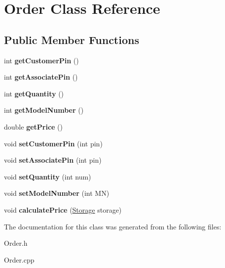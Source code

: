 \hypertarget{classOrder}{}\section{Order Class Reference}
\label{classOrder}
\subsection*{Public Member Functions}
\begin{DoxyCompactItemize}
\item 
int {\bfseries get\+Customer\+Pin} ()\hypertarget{classOrder_a580409072a98cb93cb79962d8b97ebdd}{}\label{classOrder_a580409072a98cb93cb79962d8b97ebdd}

\item 
int {\bfseries get\+Associate\+Pin} ()\hypertarget{classOrder_ab59d867a7364b9c282d8db09d2abe03e}{}\label{classOrder_ab59d867a7364b9c282d8db09d2abe03e}

\item 
int {\bfseries get\+Quantity} ()\hypertarget{classOrder_a458491516d3ef8338525f9be5f5f7dc8}{}\label{classOrder_a458491516d3ef8338525f9be5f5f7dc8}

\item 
int {\bfseries get\+Model\+Number} ()\hypertarget{classOrder_a8379026e646f8e9dc8efe19325bb3ee3}{}\label{classOrder_a8379026e646f8e9dc8efe19325bb3ee3}

\item 
double {\bfseries get\+Price} ()\hypertarget{classOrder_a587e5e46cc3dbe79cfc6c8a1634b845d}{}\label{classOrder_a587e5e46cc3dbe79cfc6c8a1634b845d}

\item 
void {\bfseries set\+Customer\+Pin} (int pin)\hypertarget{classOrder_ab5c20f421dc1f2a6e33093baaab606a1}{}\label{classOrder_ab5c20f421dc1f2a6e33093baaab606a1}

\item 
void {\bfseries set\+Associate\+Pin} (int pin)\hypertarget{classOrder_a3fe28671364733e57b3c409d7910909c}{}\label{classOrder_a3fe28671364733e57b3c409d7910909c}

\item 
void {\bfseries set\+Quantity} (int num)\hypertarget{classOrder_a45a25ede1d3cb3c47240cd87b77bfe5e}{}\label{classOrder_a45a25ede1d3cb3c47240cd87b77bfe5e}

\item 
void {\bfseries set\+Model\+Number} (int MN)\hypertarget{classOrder_a539c93f3494750c62eb287e25f2562fa}{}\label{classOrder_a539c93f3494750c62eb287e25f2562fa}

\item 
void {\bfseries calculate\+Price} (\hyperlink{classStorage}{Storage} storage)\hypertarget{classOrder_af8703a4de7d66900f44aa4d7aeed9073}{}\label{classOrder_af8703a4de7d66900f44aa4d7aeed9073}

\end{DoxyCompactItemize}


The documentation for this class was generated from the following files\+:\begin{DoxyCompactItemize}
\item 
Order.\+h\item 
Order.\+cpp\end{DoxyCompactItemize}
